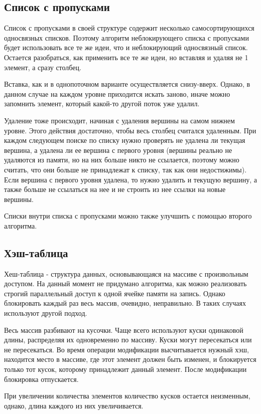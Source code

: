 \documentclass[12pt]{article}
\begin{document}
{			\subsection{Список с пропусками}
				\par Список с пропусками в своей структуре содержит несколько самосортирующихся односвязных списков. Поэтому алгоритм неблокирующего списка с пропусками будет использовать все те же идеи, что и неблокирующий односвязный список. Остается разобраться, как применить все те же идеи, но вставляя и удаляя не 1 элемент, а сразу столбец. 
				\par Вставка, как и в однопоточном варианте осуществляется снизу-вверх. Однако, в данном случае на каждом уровне приходится искать заново, иначе можно запомнить элемент, который какой-то другой поток уже удалил.
				\par Удаление тоже происходит, начиная с удаления вершины на самом нижнем уровне. Этого действия достаточно, чтобы весь столбец считался удаленным. При каждом следующем поиске по списку нужно проверять не удалена ли текущая вершина, а удалена ли ее вершина с первого уровня (вершины реально не удаляются из памяти, но на них больше никто не ссылается, поэтому можно считать, что они больше не принадлежат к списку, так как они недостижимы). Если вершина с первого уровня удалена, то нужно удалить и текущую вершину, а также больше не ссылаться на нее и не строить из нее ссылки на новые вершины.
				\par Списки внутри списка с пропусками можно также улучшить с помощью второго алгоритма.
			\subsection{Хэш-таблица}
				\par Хеш-таблица - структура данных, основывающаяся на массиве с произвольным доступом. На данный момент не придумано алгоритма, как можно реализовать строгий параллельный доступ к одной ячейке памяти на запись. Однако блокировать каждый раз весь массив, очевидно, неправильно. В таких случаях используют другой подход.
				\par Весь массив разбивают на кусочки. Чаще всего используют куски одинаковой длины, распределяя их одновременно по массиву. Куски могут пересекаться или не пересекаться. Во время операции модификации высчитывается нужный хэш, находится место в массиве, где этот элемент должен быть изменен, и блокируется только тот кусок, которому принадлежит данный элемент. После модификации блокировка отпускается.
				\par При увеличении количества элементов количество кусков остается неизменным, однако, длина каждого из них увеличивается.
				
}
\end{document}
